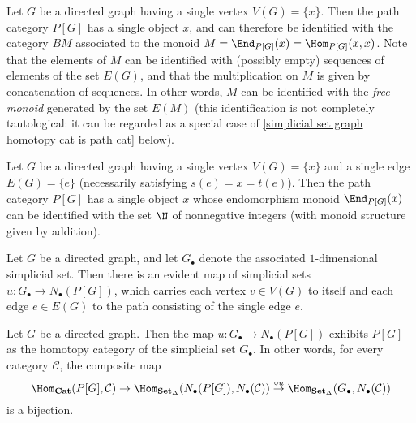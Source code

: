 \begin{example}
Let $G$ be a directed graph having a single vertex $V(G)=\{x\}$. Then the path category $P[G]$ has a single object $x$, and can therefore be identified with the category $BM$ associated to the monoid $M=\End_{P[G]}(x)=\Hom_{P[G]}(x,x)$. Note that the elements of $M$ can be identified with (possibly empty) sequences of elements of the set $E(G)$, and that the multiplication on $M$ is given by concatenation of sequences. In other words, $M$ can be identified with the \textit{free monoid} generated by the set $E(M)$ (this identification is not completely tautological: it can be regarded as a special case of \cref{simplicial set graph homotopy cat is path cat} below).
\end{example}
\begin{example}
Let $G$ be a directed graph having a single vertex $V(G)=\{x\}$ and a single edge $E(G)=\{e\}$ (necessarily satisfying $s(e)=x=t(e)$). Then the path category $P[G]$ has a single object $x$ whose endomorphism monoid $\End_{P[G]}(x)$ can be identified with the set $\N$ of nonnegative integers (with monoid structure given by addition).
\end{example}
Let $G$ be a directed graph, and let $G_\bullet$ denote the associated $1$-dimensional simplicial set. Then there is an evident map of simplicial sets $u:G_\bullet\to N_\bullet(P[G])$, which carries each vertex $v\in V(G)$ to itself and each edge $e\in E(G)$ to the path consisting of the single edge $e$.
\begin{proposition}\label{simplicial set graph homotopy cat is path cat}
Let $G$ be a directed graph. Then the map $u:G_\bullet\to N_\bullet(P[G])$ exhibits $P[G]$ as the homotopy category of the simplicial set $G_\bullet$. In other words, for every category $\mathcal{C}$, the composite map
\[\Hom_{\mathbf{Cat}}(P[G],\mathcal{C})\to\Hom_{\mathbf{Set}_\Delta}(N_\bullet(P[G]),N_\bullet(\mathcal{C}))\stackrel{\circ u}{\to}\Hom_{\mathbf{Set}_\Delta}(G_\bullet,N_\bullet(\mathcal{C}))\]
is a bijection.
\end{proposition}
